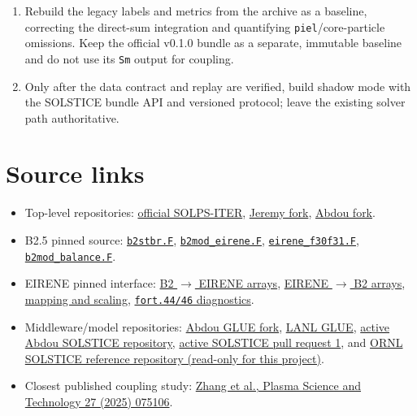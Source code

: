 \documentclass[11pt]{article}
\begin{document}
\begin{enumerate}
\item Rebuild the legacy labels and metrics from the archive as a baseline, correcting the direct-sum integration and quantifying \texttt{piel}/core-particle omissions. Keep the official v0.1.0 bundle as a separate, immutable baseline and do not use its \texttt{Sm} output for coupling.
\item Only after the data contract and replay are verified, build shadow mode with the SOLSTICE bundle API and versioned protocol; leave the existing solver path authoritative.
\end{enumerate}

\section{Source links}

\begin{itemize}
\item Top-level repositories: \href{https://github.com/iterorganization/SOLPS-ITER}{official SOLPS-ITER}, \href{https://github.com/jlore/SOLPS-ITER}{Jeremy fork}, \href{https://github.com/abdoudiaw/SOLPS-ITER}{Abdou fork}.
\item B2.5 pinned source: \href{https://github.com/iterorganization/B2.5/blob/cb7d15b2878074bb450666bebee4b1df02ef79e6/src/sources/b2stbr.F}{\texttt{b2stbr.F}}, \href{https://github.com/iterorganization/B2.5/blob/cb7d15b2878074bb450666bebee4b1df02ef79e6/src/sources/b2mod_eirene.F}{\texttt{b2mod\_eirene.F}}, \href{https://github.com/iterorganization/B2.5/blob/cb7d15b2878074bb450666bebee4b1df02ef79e6/src/sources/eirene_f30f31.F}{\texttt{eirene\_f30f31.F}}, \href{https://github.com/iterorganization/B2.5/blob/cb7d15b2878074bb450666bebee4b1df02ef79e6/src/modules/b2mod_balance.F}{\texttt{b2mod\_balance.F}}.
\item EIRENE pinned interface: \href{https://github.com/iterorganization/EIRENE/blob/f8f63fa0f69d7fb64a7d19f2ec372fd58eb5efc5/src/interfaces/couple_SOLPS-ITER/eirmod_braeir.f}{B2 $\rightarrow$ EIRENE arrays}, \href{https://github.com/iterorganization/EIRENE/blob/f8f63fa0f69d7fb64a7d19f2ec372fd58eb5efc5/src/interfaces/couple_SOLPS-ITER/eirmod_eirbra.F}{EIRENE $\rightarrow$ B2 arrays}, \href{https://github.com/iterorganization/EIRENE/blob/f8f63fa0f69d7fb64a7d19f2ec372fd58eb5efc5/src/interfaces/couple_SOLPS-ITER/eirmod_infcop.F}{mapping and scaling}, \href{https://github.com/iterorganization/EIRENE/blob/f8f63fa0f69d7fb64a7d19f2ec372fd58eb5efc5/src/interfaces/couple_SOLPS-ITER/eirmod_extrab25.F90}{\texttt{fort.44/46} diagnostics}.
\item Middleware/model repositories: \href{https://github.com/abdoudiaw/GLUE}{Abdou GLUE fork}, \href{https://github.com/lanl/GLUE}{LANL GLUE}, \href{https://github.com/abdoudiaw/solstice}{active Abdou SOLSTICE repository}, \href{https://github.com/abdoudiaw/solstice/pull/1}{active SOLSTICE pull request 1}, and \href{https://github.com/ORNL-Fusion/solstice}{ORNL SOLSTICE reference repository (read-only for this project)}.
\item Closest published coupling study: \href{https://doi.org/10.1088/2058-6272/add1b0}{Zhang et al., Plasma Science and Technology 27 (2025) 075106}.
\end{itemize}
\end{document}
